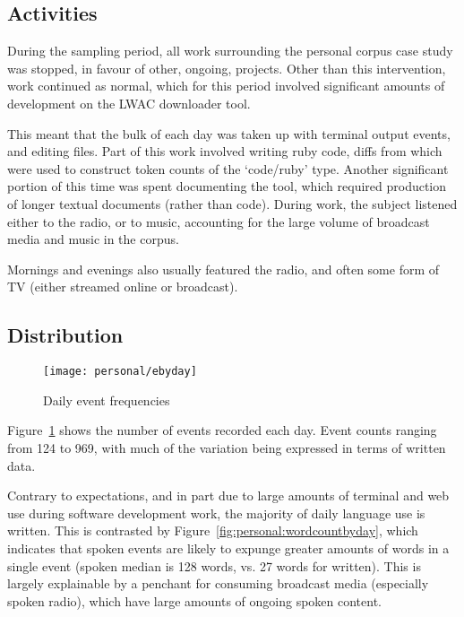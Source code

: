 




\subsection{Activities}
During the sampling period, all work surrounding the personal corpus case study was stopped, in favour of other, ongoing, projects.  Other than this intervention, work continued as normal, which for this period involved significant amounts of development on the LWAC downloader tool.

This meant that the bulk of each day was taken up with terminal output events, and editing files.  Part of this work involved writing ruby code, diffs from which were used to construct token counts of the `code/ruby' type.  Another significant portion of this time was spent documenting the tool, which required production of longer textual documents (rather than code).  During work, the subject listened either to the radio, or to music, accounting for the large volume of broadcast media and music in the corpus.

Mornings and evenings also usually featured the radio, and often some form of TV (either streamed online or broadcast).







\subsection{Distribution}

\begin{figure}[hp]
    \centering
    \texttt{[image: personal/ebyday]}
    \caption{Daily event frequencies}
    \label{fig:personal:eventcountbyday}
\end{figure}


Figure~\ref{fig:personal:eventcountbyday} shows the number of events recorded each day.  Event counts ranging from 124 to 969, with much of the variation being expressed in terms of written data.

Contrary to expectations, and in part due to large amounts of terminal and web use during software development work, the majority of daily language use is written.  This is contrasted by Figure~\ref{fig:personal:wordcountbyday}, which indicates that spoken events are likely to expunge greater amounts of words in a single event (spoken median is 128 words, vs. 27 words for written).  This is largely explainable by a penchant for consuming broadcast media (especially spoken radio), which have large amounts of ongoing spoken content.



